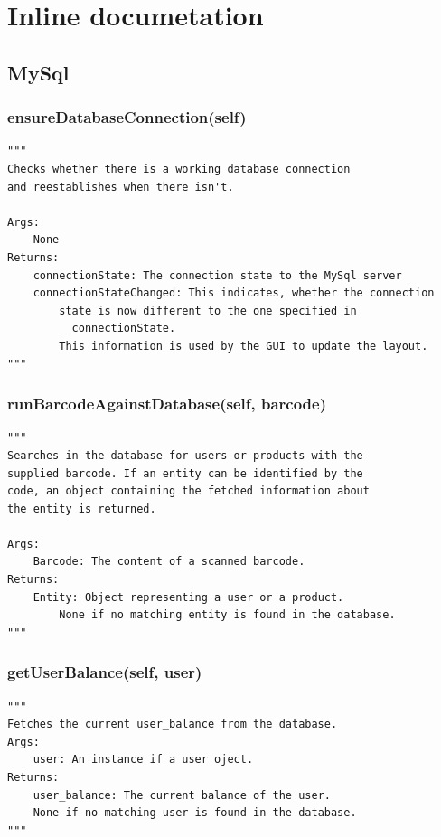 \documentclass[12pt]{article}
\begin{document}
{\appendix

\section{Inline documetation}

\subsection{MySql}

\subsubsection{ensureDatabaseConnection(self)}
\label{func:ensureDatabaseConnection}

\begin{verbatim}
"""
Checks whether there is a working database connection 
and reestablishes when there isn't.

Args: 
    None
Returns:
    connectionState: The connection state to the MySql server
    connectionStateChanged: This indicates, whether the connection
        state is now different to the one specified in 
        __connectionState.
        This information is used by the GUI to update the layout.
"""
\end{verbatim}

\subsubsection{runBarcodeAgainstDatabase(self, barcode)}
\label{func:runBarcodeAgainstDatabase}

\begin{verbatim}
"""
Searches in the database for users or products with the 
supplied barcode. If an entity can be identified by the 
code, an object containing the fetched information about
the entity is returned.

Args: 
    Barcode: The content of a scanned barcode.
Returns:
    Entity: Object representing a user or a product. 
        None if no matching entity is found in the database. 
"""
\end{verbatim}

\subsubsection{getUserBalance(self, user)}
\label{func:getUserBalance}

\begin{verbatim}
"""
Fetches the current user_balance from the database.
Args:
    user: An instance if a user oject.
Returns:
    user_balance: The current balance of the user.
    None if no matching user is found in the database.
"""
\end{verbatim}


}
\end{document}
